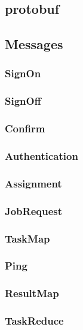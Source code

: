 \documentclass[12pt, letterpaper]{article}
\begin{document}
\subsection{protobuf}

\subsection{Messages}

\subsubsection{SignOn}


\subsubsection{SignOff}

\subsubsection{Confirm}

\subsubsection{Authentication}

\subsubsection{Assignment}

\subsubsection{JobRequest}

\subsubsection{TaskMap}

\subsubsection{Ping}

\subsubsection{ResultMap}

\subsubsection{TaskReduce}
\end{document}
